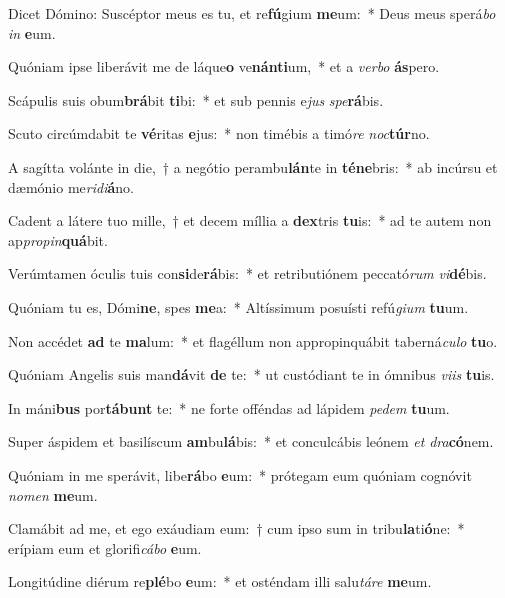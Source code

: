 \item Dicet Dómino: Suscéptor meus es tu, et re\textbf{fú}gium \textbf{me}um:~* Deus meus sperá\textit{bo} \textit{in} \textbf{e}um.
\item Quóniam ipse liberávit me de láque\textbf{o} ve\textbf{nán}\textbf{ti}um,~* et a \textit{ver}\textit{bo} \textbf{ás}pero.
\item Scápulis suis obum\textbf{brá}bit \textbf{ti}bi:~* et sub pennis e\textit{jus} \textit{spe}\textbf{rá}bis.
\item Scuto circúmdabit te \textbf{vé}ritas \textbf{e}jus:~* non timébis a timó\textit{re} \textit{noc}\textbf{túr}no.
\item A sagítta volánte in die,~† a negótio perambu\textbf{lán}te in \textbf{té}\textbf{ne}bris:~* ab incúrsu et dæmónio me\textit{ri}\textit{di}\textbf{á}no.
\item Cadent a látere tuo mille,~† et decem míllia a \textbf{dex}tris \textbf{tu}is:~* ad te autem non ap\textit{pro}\textit{pin}\textbf{quá}bit.
\item Verúmtamen óculis tuis con\textbf{si}de\textbf{rá}bis:~* et retributiónem peccató\textit{rum} \textit{vi}\textbf{dé}bis.
\item Quóniam tu es, Dómi\textbf{ne}, spes \textbf{me}a:~* Altíssimum posuísti refú\textit{gi}\textit{um} \textbf{tu}um.
\item Non accédet \textbf{ad} te \textbf{ma}lum:~* et flagéllum non appropinquábit taberná\textit{cu}\textit{lo} \textbf{tu}o.
\item Quóniam Angelis suis man\textbf{dá}vit \textbf{de} te:~* ut custódiant te in ómnibus \textit{vi}\textit{is} \textbf{tu}is.
\item In máni\textbf{bus} por\textbf{tá}\textbf{bunt} te:~* ne forte offéndas ad lápidem \textit{pe}\textit{dem} \textbf{tu}um.
\item Super áspidem et basilíscum \textbf{am}bu\textbf{lá}bis:~* et conculcábis leónem \textit{et} \textit{dra}\textbf{có}nem.
\item Quóniam in me sperávit, libe\textbf{rá}bo \textbf{e}um:~* prótegam eum quóniam cognóvit \textit{no}\textit{men} \textbf{me}um.
\item Clamábit ad me, et ego exáudiam eum:~† cum ipso sum in tribu\textbf{la}ti\textbf{ó}ne:~* erípiam eum et glorifi\textit{cá}\textit{bo} \textbf{e}um.
\item Longitúdine diérum re\textbf{plé}bo \textbf{e}um:~* et osténdam illi salu\textit{tá}\textit{re} \textbf{me}um.
